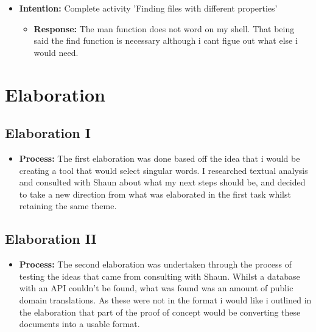 \documentclass{article}
\begin{document}
\begin{itemize}
\begin{itemize}
\end{itemize}

\item{\textbf{Intention:} Complete activity 'Finding files with different properties'}

\begin{itemize}
\item{\textbf{Response:} The man function does not word on my shell. That being said the find function is necessary although i cant figue out what else i would need.}


\end{itemize}
\end{itemize}

\vspace{5mm}
\section{Elaboration}
\subsection{Elaboration I}
\date{29/08/2019 14:00}
\begin{itemize}
\item{\textbf{Process:} The first elaboration was done based off the idea that i would be creating a tool that would select singular words. I researched textual analysis and consulted with Shaun about what my next steps should be, and decided to take a new direction from what was elaborated in the first task whilst retaining the same theme.}

\end{itemize}

\subsection{Elaboration II}

\date{05/09/2019 13:00}

\begin{itemize}
\item{\textbf{Process:} The second elaboration was undertaken through the process of testing the ideas that came from consulting with Shaun. Whilst a database with an API couldn't be found, what was found was an amount of public domain translations. As these were not in the format i would like i outlined in the elaboration that part of the proof of concept would be converting these documents into a usable format.}


\end{itemize}
\vspace{5mm}
\end{document}
